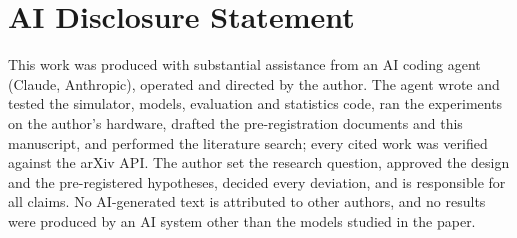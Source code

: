 \section*{AI Disclosure Statement}

This work was produced with substantial assistance from an AI coding agent (Claude, Anthropic),
operated and directed by the author. The agent wrote and tested the simulator, models, evaluation
and statistics code, ran the experiments on the author's hardware, drafted the pre-registration
documents and this manuscript, and performed the literature search; every cited work was
verified against the arXiv API. The author set the research question, approved the design and
the pre-registered hypotheses, decided every deviation, and is responsible for all claims. No
AI-generated text is attributed to other authors, and no results were produced by an AI system
other than the models studied in the paper.
